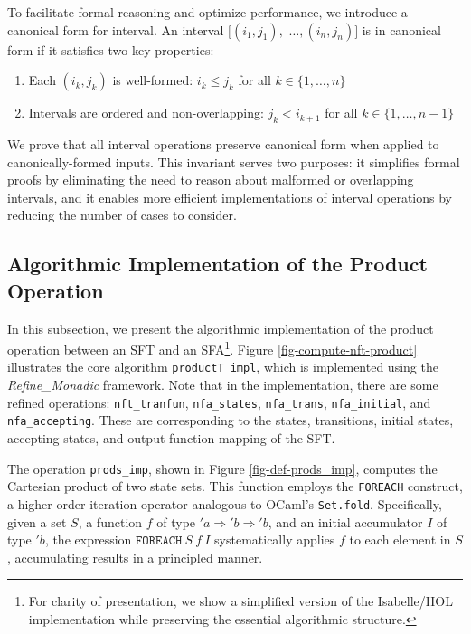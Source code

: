 \documentclass[sigplan,10pt,anonymous,review]{acmart}\settopmatter{printfolios=true,printccs=false,printacmref=false}
\begin{document}
To facilitate formal reasoning and optimize performance, we introduce a canonical form for interval. An interval $[(i_1, j_1), $ $\ldots, (i_n, j_n)]$ is in canonical form if it satisfies two key properties:
\begin{enumerate}
  \item Each $(i_k, j_k)$ is well-formed: $i_k \leq j_k$ for all $k \in \{1,\ldots,n\}$
  \item Intervals are ordered and non-overlapping: $j_k < i_{k+1}$ for all $k \in \{1,\ldots,n-1\}$
\end{enumerate}

We prove that all interval operations preserve canonical form when applied to canonically-formed inputs. This invariant serves two purposes: it simplifies formal proofs by eliminating the need to reason about malformed or overlapping intervals, and it enables more efficient implementations of interval operations by reducing the number of cases to consider.



\subsection{Algorithmic Implementation of the Product Operation}

In this subsection, we present the algorithmic implementation of the product operation between an SFT and an SFA\footnote{For clarity of presentation, we show a simplified version of the Isabelle/HOL implementation while preserving the essential algorithmic structure.}. 
%
Figure \ref{fig-compute-nft-product} illustrates the core algorithm \texttt{productT\_impl}, which is implemented using the \emph{Refine\_Monadic} framework. Note that in the implementation, there are some refined operations: \texttt {nft\_tranfun}, \texttt{nfa\_states}, \texttt{nfa\_trans}, \texttt{nfa\_initial}, and \texttt{nfa\_accepting}. These are corresponding to the states, transitions, initial states, accepting states, and output function mapping of the SFT.

The operation \texttt{prods\_imp}, shown in Figure \ref{fig-def-prods_imp}, computes the Cartesian product of two state sets. This function employs the \texttt{FOREACH} construct, a higher-order iteration operator analogous to OCaml's \texttt{Set.fold}. Specifically, given a set $S$, a function $f$ of type $'a \Rightarrow 'b \Rightarrow 'b$, and an initial accumulator $I$ of type $'b$, the expression $\texttt{FOREACH}~S~f~I$ systematically applies $f$ to each element in $S$, accumulating results in a principled manner.
\end{document}

